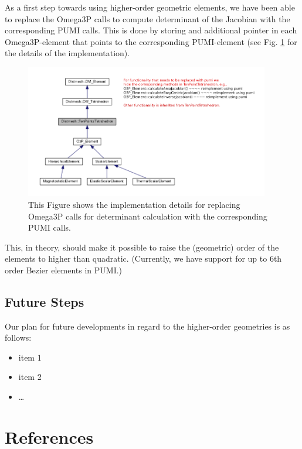 \documentclass[review,12pt]{elsarticle_summary_report}
\begin{document}
As a first step towards using higher-order geometric elements, we have been able to replace the Omega3P calls to compute determinant of the Jacobian with the corresponding PUMI calls. This is done by storing and additional pointer in each Omega3P-element that points to the corresponding  PUMI-element (see Fig. \ref{imp} for the details of the implementation).
\begin{figure}[ph!]
\centering
\includegraphics[width=0.95\textwidth]{hide_ten_point_tet.png}
\caption{\label{imp} This Figure shows the implementation details for replacing Omega3P calls for determinant calculation with the corresponding PUMI calls.}
\end{figure}
This, in theory, should make it possible to raise the (geometric) order of the elements to higher than quadratic. (Currently, we have support for up to 6th order Bezier elements in PUMI.)

\subsection{\label{high_order_geom_future} Future Steps}

Our plan for future developments in regard to the higher-order geometries is as follows:
\begin{itemize}
  \item item 1
  \item item 2
  \item \dots
\end{itemize}

\section*{References}
% 


\end{document}

